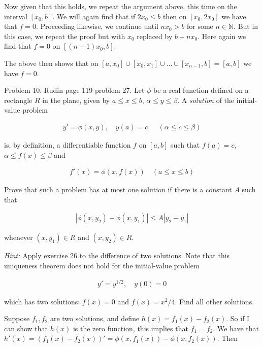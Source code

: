 \documentclass{article}
\begin{document}
  Now given that this holds, we repeat the argument above, this time on the interval $[x_0,b]$.  We will again find that if $2x_0 \leq b$ then on $[x_0,2x_0]$ we have that $f=0$.  Proceeding likewise, we continue until $nx_0>b$ for some $n\in\mathbb N$.  But in this case, we repeat the proof but with $x_0$ replaced by $b-nx_0$.  Here again we find that $f=0$ on $[(n-1)x_0,b]$.

  The above then shows that on $[a,x_0]\cup[x_0,x_1]\cup\dots\cup[x_{n-1},b]=[a,b]$ we have $f=0$.

  \pagebreak

  {\Large \color{Sepia} Problem 10. Rudin page 119 problem 27. Let $\phi$ be a real function defined on a rectangle $R$ in the plane, given by $a\leq x\leq b$, $\alpha\leq y\leq \beta$.  A {\it solution} of the initial-value problem

  \begin{align*}
    y' = \phi(x,y), \quad y(a)=c, \quad (\alpha\leq c\leq \beta)
  \end{align*}

  is, by definition, a differentiable function $f$ on $[a,b]$ such that $f(a)=c$, $\alpha\leq f(x)\leq \beta$ and

  \begin{align*}
    f'(x)=\phi(x,f(x)) \quad (a\leq x\leq b)
  \end{align*}

  Prove that such a problem has at most one solution if there is a constant $A$ such that

  \begin{align*}
    |\phi(x,y_2)-\phi(x,y_1)|\leq A|y_2-y_1|
  \end{align*}

  whenever $(x,y_1)\in R$ and $(x,y_2)\in R$.

  {\it Hint:} Apply exercise 26 to the difference of two solutions.  Note that this uniqueness theorem does not hold for the initial-value problem

  \begin{align*}
    y'=y^{1/2}, \quad y(0)=0
  \end{align*}

  which has two solutions: $f(x)=0$ and $f(x)=x^2/4$.  Find all other solutions.

  }

  \vspace{1cm}

  Suppose $f_1, f_2$ are two solutions, and define $h(x)=f_1(x)-f_2(x)$.  So if I can show that $h(x)$ is the zero function, this implies that $f_1=f_2$. We have that  $h'(x) = (f_1(x)-f_2(x))' = \phi(x,f_1(x))-\phi(x,f_2(x))$.  Then
\end{document}
